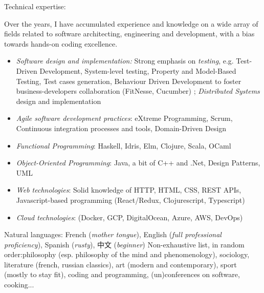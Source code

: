 \documentclass[12pt,a4paper]{article}
\begin{document}




\inlineheadsection
    {Technical expertise:}
    {Over the years, I have accumulated experience and knowledge on a wide array of fields related to software architecting, engineering and development, with a bias towards hands-on coding excellence.
      \begin{itemize}
      \item \emph{Software design and implementation:} Strong emphasis on \emph{testing}, e.g. Test-Driven Development, System-level testing, Property and Model-Based Testing, Test cases generation, Behaviour Driven Development to foster business-developers collaboration (FitNesse, Cucumber) ; \emph{Distributed Systems} design and implementation
      \item \emph{Agile software development practices}: eXtreme Programming, Scrum, Continuous integration processes and tools, Domain-Driven Design
      \item \emph{Functional Programming}: Haskell, Idris, Elm, Clojure, Scala, OCaml
      \item \emph{Object-Oriented Programming}: Java, a bit of C++ and .Net, Design Patterns, UML
      \item \emph{Web technologies}: Solid knowledge of HTTP, HTML, CSS, REST APIs, Javascript-based programming (React/Redux, Clojurescript, Typescript)
      \item \emph{Cloud technologies}: (Docker, GCP, DigitalOcean, Azure, AWS, DevOps)
      \end{itemize}
    }
    \inlineheadsection
        {Natural languages:}
        {French (\emph{mother tongue}), English (\emph{full professional proficiency}), Spanish (\emph{rusty}), 中文 (\emph{beginner})}
\inlineheadsection
    {Non-exhaustive list, in random order:}{philosophy (esp. philosophy of the mind and phenomenology), sociology, literature (french, russian classics), art (modern and contemporary), sport (mostly to stay fit), coding and programming, (un)conferences on software, cooking...}
\end{document}
